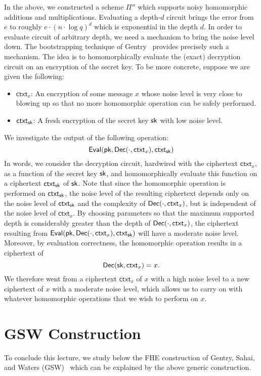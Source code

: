 \documentclass[10pt,twoside]{article}
\newcommand{\ctxt}{\mathsf{ctxt}}
\begin{document}
In the above, we constructed a scheme $\Pi''$ which supports noisy homomorphic additions and multiplications.
Evaluating a depth-$d$ circuit brings the error from $e$ to roughly $e \cdot (n \cdot \log q)^d$ which is exponential in the depth $d$.
In order to evaluate circuit of arbitrary depth, we need a mechanism to bring the noise level down.
The bootstrapping technique of Gentry~\cite{STOC:Gentry09} provides precisely such a mechanism.
The idea is to homomorphically evaluate the (exact) decryption circuit on an encryption of the secret key.
To be more concrete, suppose we are given the following:
\begin{itemize}
    \item $\ctxt_x$: An encryption of some message $x$ whose noise level is very close to blowing up so that no more homomorphic operation can be safely performed.
    \item $\ctxt_\sk$: A fresh encryption of the secret key $\sk$ with low noise level.
\end{itemize}
We investigate the output of the following operation:
\[
    \eval(\pk, \dec(\cdot, \ctxt_x), \ctxt_\sk)
\]
In words, we consider the decryption circuit, hardwired with the ciphertext $\ctxt_x$, as a function of the secret key $\sk$, and homomorphically evaluate this function on a ciphertext $\ctxt_\sk$ of $\sk$.
Note that since the homomorphic operation is performed on $\ctxt_\sk$, the noise level of the resulting ciphertext depends only on the noise level of $\ctxt_\sk$ and the complexity of $\dec(\cdot, \ctxt_x)$, but is independent of the noise level of $\ctxt_x$.
By choosing parameters so that the maximum supported depth is considerably greater than the depth of $\dec(\cdot, \ctxt_x)$, the ciphertext resulting from $\eval(\pk, \dec(\cdot, \ctxt_x), \ctxt_\sk)$ will have a moderate noise level. 
Moreover, by evaluation correctness, the homomorphic operation results in a ciphertext of
\[
    \dec(\sk, \ctxt_x) = x.
\]
We therefore went from a ciphertext $\ctxt_x$ of $x$ with a high noise level to a new ciphertext of $x$ with a moderate noise level, which allows us to carry on with whatever homomorphic operations that we wish to perform on $x$.

\section{GSW Construction}

To conclude this lecture, we study below the FHE construction of Gentry, Sahai, and Waters (GSW)~\cite{C:GenSahWat13} which can be explained by the above generic construction.
\end{document}
